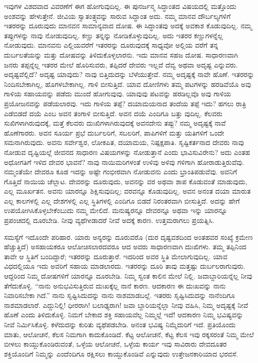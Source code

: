 ಇವುಗಳ ವಿಶದವಾದ ವಿವರಣೆಗೆ ಈಗ ಹೋಗುವುದಿಲ್ಲ. ಈ ಪುನರ್ಜನ್ಮ ಸಿದ್ಧಾಂತದ ವಿಷಯದಲ್ಲಿ ಮತ್ತೊಂದು ಅಂಶವನ್ನು ಹೇಳುತ್ತೇನೆ. ಜೀವಿಯ ಸ್ವಾತಂತ್ರ್ಯವನ್ನು ಸಾರುವ ಸಿದ್ಧಾಂತ ಅದು. ನಮ್ಮ ಮಾನವ ದೌರ್ಬಲ್ಯಗಳಿಗೆ ಇತರರನ್ನು ದೂರುವುದು ಮಾನವನ ಸಾಮಾನ್ಯವಾದ ದೋಷ. ಈ ಸಿದ್ಧಾಂತವು ಅದಕ್ಕೆ ಅವಕಾಶ ಕೊಡುವುದಿಲ್ಲ. ನಮ್ಮ ತಪ್ಪುಗಳನ್ನು ನಾವು ನೋಡುವುದಿಲ್ಲ. ಕಣ್ಣು ತನ್ನನ್ನು ನೋಡಿಕೊಳ್ಳುವುದಿಲ್ಲ. ಅದು ಇತರರ ಕಣ್ಣುಗಳನ್ನೆಲ್ಲ ನೋಡುವುದು. ಮಾನವನು ಎಲ್ಲಿಯವರೆಗೆ ಇತರರನ್ನು ದೂರುವುದಕ್ಕೆ ಸಾಧ್ಯವೋ ಅಲ್ಲಿಯ ವರೆಗೆ ತನ್ನ ದುರ್ಬಲತೆಯನ್ನು ಮತ್ತು ದೋಷವನ್ನು ತಿಳಿದುಕೊಳ್ಳಲಾರನು. ಇದು ಮಾನವ ಸಹಜ ದೋಷ. ಸಾಧಾರಣವಾಗಿ ಜನರು ತಪ್ಪನ್ನೆಲ್ಲ ಇತರರ ಮೇಲೆ ಹೊರಿಸುವರು, ತಪ್ಪಿದರೆ ದೇವರು ಇಲ್ಲವೆ ದೆವ್ವ ಅಥವಾ ಅದೃಷ್ಟ ಎನ್ನುವರು. ಅದೃಷ್ಟವೆಲ್ಲಿದೆ? ಅದೃಷ್ಟ ಯಾವುದು? ನಾವು ಬಿತ್ತಿದುದನ್ನು ಬೆಳೆಯುತ್ತೇವೆ. ನಮ್ಮ ಅದೃಷ್ಟಕ್ಕೆ ನಾವೇ ಹೊಣೆ. ಇತರರನ್ನು ನಿಂದಿಸಬೇಕಾಗಿಲ್ಲ, ಹೊಗಳಬೇಕಾಗಿಲ್ಲ. ಗಾಳಿ ಬೀಸುತ್ತಿದೆ. ಯಾವ ದೋಣಿಗಳು ತಮ್ಮ ಪಟಗಳನ್ನು ಹರಡಿವೆಯೊ ಅವು ಗಾಳಿಯ ಸಹಾಯವನ್ನು ಪಡೆದು ಮುಂದೆ ಹೋಗುವುವು. ಯಾವುವು ಪಟವನ್ನು ಹರಡಿಲ್ಲವೊ ಅವು ಗಾಳಿಯ ಪ್ರಯೋಜನವನ್ನು ಪಡೆಯಲಾರವು. ಇದು ಗಾಳಿಯ ತಪ್ಪೆ? ದಯಾಮಯನಾದ ತಂದೆಯ ತಪ್ಪೆ ಇದು? ಹಗಲು ರಾತ್ರಿ ಎಡೆಬಿಡದೆ ದಯೆ ಎಂಬ ಅವನ ತಂಗಾಳಿ ಬೀಸುತ್ತಿದೆ. ಅವನ ದಯೆ ಎಂದಿಗೂ ಬತ್ತು ವುದಿಲ್ಲ. ಕೆಲವರು ಸುಖಿಗಳಾಗಿರುವುದಕ್ಕೆ, ಮತ್ತೆ ಕೆಲವರು ದುಃಖಿಗಳಾಗಿರುವುದಕ್ಕೆ ಅವನದೇನು ತಪ್ಪು? ನಮ್ಮ ಅದೃಷ್ಟಕ್ಕೆ ನಾವೆ ಹೊಣೆಗಾರರು. ಅವನ ಸೂರ್ಯ ಪ್ರಭೆ ದುರ್ಬಲರಿಗೆ, ಸಬಲರಿಗೆ, ಪಾಪಿಗಳಿಗೆ ಮತ್ತು ಯತಿಗಳಿಗೆ ಒಂದೇ ಸಮನಾಗಿರುವುದು. ಅವನು ಸರ್ವೇಶ್ವರ, ಲೋಕಪಿತ, ದಯಾಮಯ, ನಿಷ್ಪಕ್ಷಪಾತಿ. ಸೃಷ್ಟಿಕರ್ತನಾದ ದೇವರು ನಾವು ನೋಡುವ ದೃಷ್ಟಿಯಲ್ಲೆ ಜೀವನದ ಸಾಧಾರಣ ವಿಷಯಗಳನ್ನು ನೋಡುತ್ತಾನೆ ಎಂದು ಭಾವಿಸುವಿರೇನು? ಅದು ಎಂತಹ ಅಧೋಗತಿಗೆ ಇಳಿದ ದೇವರ ಭಾವನೆ? ನಾವು ನಾಯಿಮರಿಗಳಂತೆ ಉಳಿವು ಅಳಿವು ಗಳಿಗಾಗಿ ಹೋರಾಡುತ್ತಿರುವೆವು. ನಮ್ಮಂತೆಯೇ ದೇವರೂ ಕೂಡ ಇದನ್ನು ಅಷ್ಟೇ ಗಂಭೀರವಾಗಿ ನೋಡುವನು ಎಂದು ಭ್ರಾಂತಿಪಡುವೆವು. ಅವನಿಗೆ ಗೊತ್ತಿದೆ ನಾಯಿಯ ಚೆಲ್ಲಾಟ. ದೇವರನ್ನು ದೂರುವುದು, ಅವನನ್ನು ವರ ಅಥವಾ ಶಾಪ ಕೊಡುವಂತೆ ಮಾಡುವುದು, ಎಲ್ಲ ಮೂರ್ಖತನ. ಅವನು ಯಾರನ್ನೂ ಶಿಕ್ಷಿಸುವುದಿಲ್ಲ; ವರವನ್ನೂ ಕೊಡುವುದಿಲ್ಲ. ಅವನ ಅನಂತ ದಯಾ ಮಾರುತ ಎಲ್ಲ ಕಾಲಗಳಲ್ಲಿ ಎಲ್ಲ ದೇಶಗಳಲ್ಲಿ ಎಲ್ಲ ಸ್ಥಿತಿಗಳಲ್ಲಿ ಎಂದಿಗೂ ಬಿಡದೆ ನಿರಂತರವಾಗಿ ಬೀಸುತ್ತಿದೆ. ಅದನ್ನು ಹೇಗೆ ಉಪಯೋಗಿಸಿಕೊಳ್ಳಬೇಕೆಂಬುದು ನಮ್ಮ ಮೇಲಿದೆ. ಮನುಷ್ಯರನ್ನೂ ದೇವರನ್ನೂ ಅಥವಾ ಇನ್ನು ಯಾರನ್ನೂ ಪ್ರಪಂಚದಲ್ಲಿ ದೂರಬೇಡಿ. ನೀವು ವ್ಯಥೆಗೀಡಾದರೆ ನೀವೆ ಅದಕ್ಕೆ ಕಾರಣ. ಉತ್ತಮರಾಗಲು ಪ್ರಯತ್ನಿಸಿ.

ಸಮಸ್ಯೆಗೆ ಇದೊಂದೇ ಪರಿಹಾರ. ಯಾರು ಅನ್ಯರನ್ನು ದೂರುವರೊ (ದುರ ದೃಷ್ಟವಶದಿಂದ ಅಂತಹವರ ಸಂಖ್ಯೆ ಕ್ರಮೇಣ ಹೆಚ್ಚುತ್ತಿದೆ) ಅಸಹಾಯಕರೂ ಆಲೋಚಿಸಲಾರದವರೂ ಆದ ಅವರು ಸಾಧಾರಣವಾಗಿ ದುಃಖಿಗಳು. ತಮ್ಮ ತಪ್ಪಿನಿಂದ ತಾವೇ ಆ ಸ್ಥಿತಿಗೆ ಬಂದಿದ್ದಾರೆ; ಇತರರನ್ನು ದೂರುತ್ತಾರೆ. ಇದರಿಂದ ಅವರ ಸ್ಥಿತಿ ಮೇಲಾಗುವುದಿಲ್ಲ. ಯಾವ ವಿಧದಲ್ಲಿಯೂ ಇದು ಅವರಿಗೆ ಸಹಾಯ ಮಾಡಲಾರದು. ಇತರರನ್ನು ದೂರಿ ತಾವು ಮತ್ತಷ್ಟು ದುರ್ಬಲರಾಗುವುರು. ಆದ್ದರಿಂದ ನಿಮ್ಮ ದೋಷಗಳಿಗೆ ಯಾರನ್ನೂ ದೂರಬೇಡಿ. ನಿಮ್ಮ ಸ್ವಂತ ಕಾಲಿನ ಮೇಲೆ ನಿಲ್ಲಿ. ಜವಾಬ್ದಾರಿಯನ್ನೆಲ್ಲ ನೀವು ತೆಗೆದುಕೊಳ್ಳಿ. “ನಾನು ಅನುಭವಿಸುತ್ತಿರುವ ದುಃಖಕ್ಕೆಲ್ಲ ನಾನೆ ಕಾರಣ. ಆದಕಾರಣ ಈ ದುಃಖವನ್ನು ನಾನು ನಿವಾರಿಸಬೇಕಾ ಗಿದೆ.” ನಾನು ಸೃಷ್ಟಿಸಿದುದನ್ನು ನಾನು ನಾಶಮಾಡಬಲ್ಲೆ. ಇತರರು ಸೃಷ್ಟಿಸಿದುದನ್ನು ನಾನೆಂದಿಗೂ ನಾಶಮಾಡಲಾರೆ. ಎದ್ದುನಿಲ್ಲಿ! ಧೀರರಾಗಿ! ಬಲಾಢ್ಯರಾಗಿ! ಜವಾ ಬ್ದಾರಿಯನ್ನೆಲ್ಲಾ ನೀವು ವಹಿಸಿ, ನಿಮ್ಮ ಅದೃಷ್ಟಕ್ಕೆ ನೀವೆ ಹೊಣೆ ಎಂದು ತಿಳಿದುಕೊಳ್ಳಿ. ನಿಮಗೆ ಬೇಕಾದ ಶಕ್ತಿ ಸಹಾಯವೆಲ್ಲ ನಿಮ್ಮಲ್ಲೆ ಇದೆ! ಆದಕಾರಣ ನಿಮ್ಮ ಭವಿಷ್ಯವನ್ನು ನೀವೆ ನಿರ್ಮಿಸಿಕೊಳ್ಳಿ. ಕಳೆದುದನ್ನು ಕುರಿತು ವ್ಯಥೆಪಡಬೇಡಿ. ಅನಂತ ಭವಿಷ್ಯ ನಿಮ್ಮೆದುರಿಗೆ ಇದೆ. ಪ್ರತಿಯೊಂದು ಮಾತು, ಆಲೋಚನೆ, ಕೆಲಸ ನಿಮಗಾಗಿ ಕಾದುಕೊಂಡಿದೆ. ಕೆಟ್ಟ ಆಲೋಚನೆ, ಕೆಟ್ಟ ಕೆಲಸ ಇವು ರಕ್ಕಸರಂತೆ ನಿಮ್ಮ ಮೇಲೆ ಬೀಳಲು ಕಾಯ್ದುಕೊಂಡಿರುವಂತೆ, ಒಳ್ಳೆಯ ಆಲೋಚನೆ, ಒಳ್ಳೆಯ ಕಾರ್ಯ ಇವು ಸಾವಿರಾರು ದೇವದೂತರ ಶಕ್ತಿಯೊಂದಿಗೆ ನಿಮ್ಮನ್ನು ಎಂದೆಂದಿಗೂ ರಕ್ಷಿಸಲು ಕಾಯ್ದುಕೊಂಡಿವೆ ಎನ್ನುವುದು ಉತ್ತೇಜನಕಾರಿಯಾದ ಭರವಸೆ.

